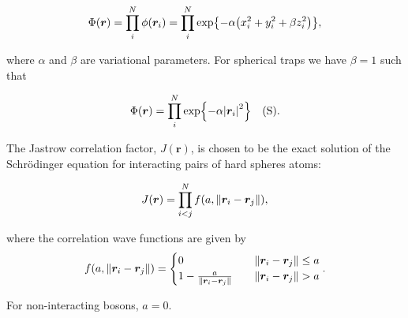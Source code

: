 \begin{equation}\label{eq:slater}
    \Phi \qty(\bm{r}) = \prod_i^N \phi \qty(\bm{r}_i) = \prod_i^N \exp{-\alpha \qty(x_i^2 + y_i^2 + \beta z_i^2)},
\end{equation}

where $\alpha$ and $\beta$ are variational parameters. For spherical traps we have $\beta = 1$ such that

\begin{equation}\label{eq:slater_spherical}
    \Phi \qty(\bm{r}) =  \prod_i^N \exp{-\alpha \abs{\bm{r}_i}^2} \quad \text{(S)}.
\end{equation} 

The Jastrow correlation factor, $J(\bm{r})$, is chosen to be the exact solution of the Schrödinger equation for interacting pairs of hard spheres atoms:

\begin{equation}\label{eq:jastrow_factor}
    J \qty(\bm{r}) = \prod_{i<j}^N f \qty(a, \norm{\bm{r}_i - \bm{r}_j}),
\end{equation}

where the correlation wave functions are given by
\begin{equation*}
    f \qty(a, \norm{\bm{r}_i - \bm{r}_j}) = 
    \begin{cases}
        0 \quad &\norm{\bm{r}_i - \bm{r}_j} \leq a
        \\
        1 - \frac{a}{\norm{\bm{r}_i - \bm{r}_j}} \quad &\norm{\bm{r}_i - \bm{r}_j} > a
    \end{cases}.
\end{equation*}

For non-interacting bosons, $a=0$. 

